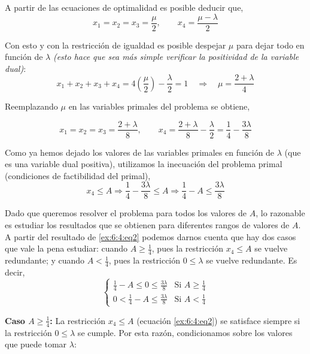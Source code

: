 A partir de las ecuaciones de optimalidad es posible deducir que,
\[
x_1 = x_2 = x_3 = \frac{\mu}{2}, \qquad x_4 = \frac{\mu - \lambda}{2}
\]

Con esto y con la restricción de igualdad es posible despejar \(\mu\) para dejar todo en función de \(\lambda\) \emph{(esto hace que sea más simple verificar la positividad de la variable dual)}:
\[
x_1 + x_2 + x_3 + x_4 = 4\left( \frac{\mu}{2} \right) - \frac{\lambda}{2} = 1
\quad \Rightarrow \quad
\mu = \frac{2 + \lambda}{4}
\]

Reemplazando \(\mu\) en las variables primales del problema se obtiene,

\begin{equation}
   x_1 = x_2 = x_3 = \frac{2 + \lambda}{8},
\qquad
x_4 = \frac{2 + \lambda}{8} - \frac{\lambda}{2} = \frac{1}{4}-\frac{3\lambda}{8}
\label{ex:6:4:eq1} 
\end{equation}

Como ya hemos dejado los valores de las variables primales en función de \(\lambda\) (que es una variable dual positiva), utilizamos la inecuación del problema primal (condiciones de factibilidad del primal),
\begin{equation}
    x_4 \leq A
\Rightarrow
\frac{1}{4}-\frac{3\lambda}{8} \leq A
\Rightarrow
\frac{1}{4}-A \leq \frac{3\lambda}{8}
\label{ex:6:4:eq2}
\end{equation}


Dado que queremos resolver el problema para todos los valores de \(A\), lo razonable es estudiar los resultados que se obtienen para diferentes rangos de valores de \(A\). A partir del resultado de \ref{ex:6:4:eq2} podemos darnos cuenta que hay dos casos que vale la pena estudiar: cuando \(A \geq \frac{1}{4}\), pues la restricción \(x_4 \leq A\) se vuelve redundante; y cuando \(A < \frac{1}{4}\), pues la restricción \(0 \leq \lambda\) se vuelve redundante. Es decir,
\[
\left\{
\begin{array}{ll}
\frac{1}{4} - A \leq 0 \leq \frac{3\lambda}{8} & \text{Si } A \geq \frac{1}{4} \\
0 < \frac{1}{4} - A \leq \frac{3\lambda}{8} & \text{Si } A < \frac{1}{4}
\end{array}
\right.
\]

\noindent
\textbf{Caso \(A \geq \frac{1}{4}\):} La restricción \(x_4 \leq A\) (ecuación \ref{ex:6:4:eq2}) se satisface siempre si la restricción \(0 \leq \lambda\) se cumple. Por esta razón, condicionamos sobre los valores que puede tomar \(\lambda\):

